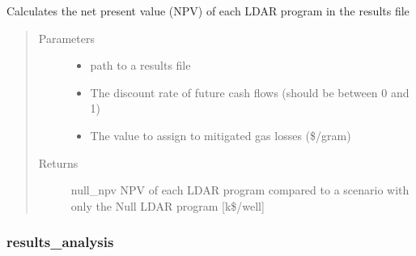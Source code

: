 \documentclass[letterpaper,10pt,english]{sphinxmanual}
\begin{document}
\begin{fulllineitems}
\label{\detokenize{index:feast.ResultsProcessing.results_analysis_functions.npv_calculator}}
Calculates the net present value (NPV) of each LDAR program in the results file
\begin{quote}\begin{description}
\item[{Parameters}] \leavevmode\begin{itemize}
\item {} 
 \textendash{} path to a results file

\item {} 
 \textendash{} The discount rate of future cash flows (should be between 0 and 1)

\item {} 
 \textendash{} The value to assign to mitigated gas losses (\$/gram)

\end{itemize}

\item[{Returns}] \leavevmode
null\_npv          NPV of each LDAR program compared to a scenario with only the Null LDAR program {[}k\$/well{]}

\end{description}\end{quote}

\end{fulllineitems}



\subsubsection{results\_analysis}
\label{\detokenize{index:results-analysis}}
\end{document}
